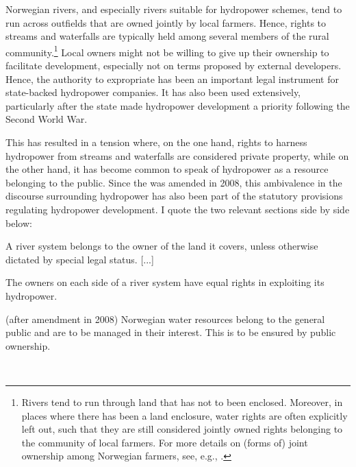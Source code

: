 Norwegian rivers, and especially rivers suitable for hydropower schemes, tend to run across outfields that are owned jointly by local farmers. Hence, rights to streams and waterfalls are typically held among several members of the rural community.\footnote{Rivers tend to run through land that has not to been enclosed. Moreover, in places where there has been a land enclosure, water rights are often explicitly left out, such that they are still considered jointly owned rights belonging to the community of local farmers. For more details on (forms of) joint ownership among Norwegian farmers, see, e.g., \cite[570]{stenseth07a}.} Local owners might not be willing to give up their ownership to facilitate development, especially not on terms proposed by external developers. Hence, the authority to expropriate has been an important legal instrument for state-backed hydropower companies. It has also been used extensively, particularly after the state made hydropower development a priority following the Second World War.

This has resulted in a tension where, on the one hand, rights to harness hydropower from streams and waterfalls are considered private property, while on the other hand, it has become common to speak of hydropower as a resource belonging to the public. Since the \cite{ica17} was amended in 2008, this ambivalence in the discourse surrounding hydropower has also been part of the statutory provisions regulating hydropower development. I quote the two relevant sections side by side below:%

{\begin{minipage}[t]{16em}
 \begin{aquote}{\tiny {}\dni\cite[13]{wra00}} \footnotesize A river system belongs to the owner of the land it covers, unless otherwise dictated by special legal status. [...]

The owners on each side of a river system have equal rights in exploiting its hydropower.
\end{aquote}  
\end{minipage}}
{\begin{minipage}[t]{22em}
\begin{aquote}{\tiny {}\dni\cite[1]{ica17} (after amendment in 2008)} \footnotesize Norwegian water resources belong to the general public and are to be managed in their interest. This is to be ensured by public ownership.
\end{aquote}
\end{minipage}} \\

